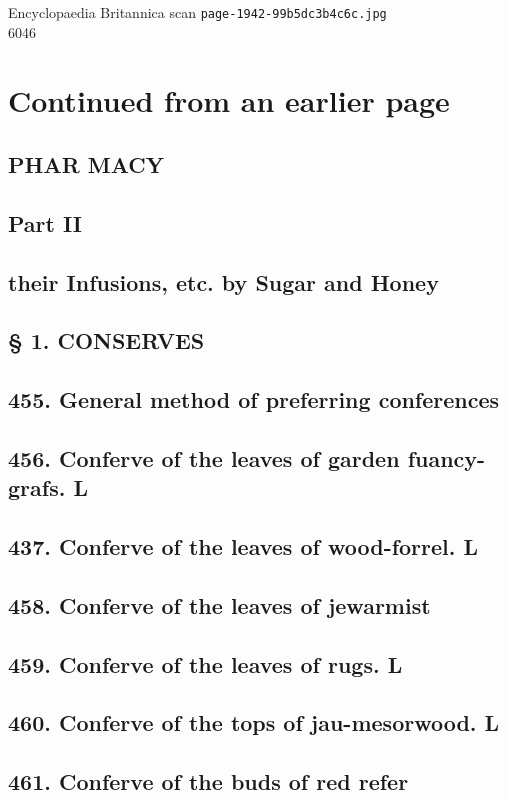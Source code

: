 \documentclass{article}
\begin{document}
\begin{center}
{\Large Encyclopaedia Britannica scan \texttt{page-1942-99b5dc3b4c6c.jpg}}\\[0.5em]
6046
\end{center}
\section*{Continued from an earlier page}
\subsection*{PHAR MACY}
\subsection*{Part II}
\subsection*{their Infusions, etc. by Sugar and Honey}
\subsection*{§ 1. CONSERVES}
\subsection*{455. General method of preferring conferences}
\subsection*{456. Conferve of the leaves of garden fuancy-grafs. L}
\subsection*{437. Conferve of the leaves of wood-forrel. L}
\subsection*{458. Conferve of the leaves of jewarmist}
\subsection*{459. Conferve of the leaves of rugs. L}
\subsection*{460. Conferve of the tops of jau-mesorwood. L}
\subsection*{461. Conferve of the buds of red refer}
\end{document}
